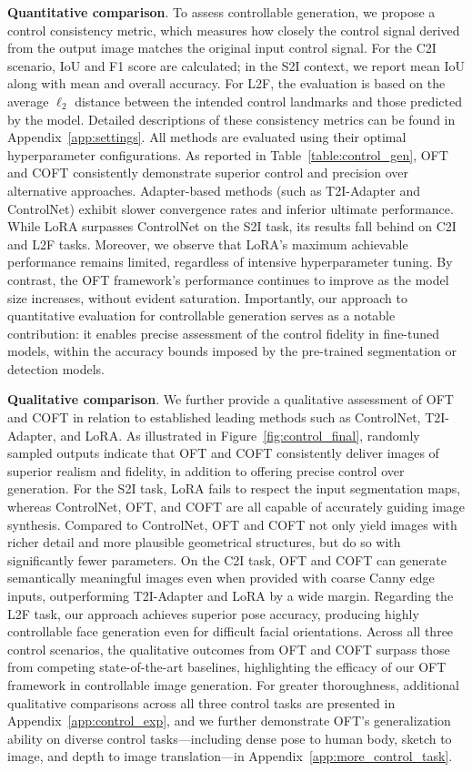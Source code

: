 \textbf{Quantitative comparison}. To assess controllable generation, we propose a control consistency metric, which measures how closely the control signal derived from the output image matches the original input control signal. For the C2I scenario, IoU and F1 score are calculated; in the S2I context, we report mean IoU along with mean and overall accuracy. For L2F, the evaluation is based on the average $\ell_2$ distance between the intended control landmarks and those predicted by the model. Detailed descriptions of these consistency metrics can be found in Appendix~\ref{app:settings}. All methods are evaluated using their optimal hyperparameter configurations. As reported in Table~\ref{table:control_gen}, OFT and COFT consistently demonstrate superior control and precision over alternative approaches. Adapter-based methods (such as T2I-Adapter and ControlNet) exhibit slower convergence rates and inferior ultimate performance. While LoRA surpasses ControlNet on the S2I task, its results fall behind on C2I and L2F tasks. Moreover, we observe that LoRA’s maximum achievable performance remains limited, regardless of intensive hyperparameter tuning. By contrast, the OFT framework’s performance continues to improve as the model size increases, without evident saturation. Importantly, our approach to quantitative evaluation for controllable generation serves as a notable contribution: it enables precise assessment of the control fidelity in fine-tuned models, within the accuracy bounds imposed by the pre-trained segmentation or detection models.

\textbf{Qualitative comparison}. We further provide a qualitative assessment of OFT and COFT in relation to established leading methods such as ControlNet, T2I-Adapter, and LoRA. As illustrated in Figure~\ref{fig:control_final}, randomly sampled outputs indicate that OFT and COFT consistently deliver images of superior realism and fidelity, in addition to offering precise control over generation. For the S2I task, LoRA fails to respect the input segmentation maps, whereas ControlNet, OFT, and COFT are all capable of accurately guiding image synthesis. Compared to ControlNet, OFT and COFT not only yield images with richer detail and more plausible geometrical structures, but do so with significantly fewer parameters. On the C2I task, OFT and COFT can generate semantically meaningful images even when provided with coarse Canny edge inputs, outperforming T2I-Adapter and LoRA by a wide margin. Regarding the L2F task, our approach achieves superior pose accuracy, producing highly controllable face generation even for difficult facial orientations. Across all three control scenarios, the qualitative outcomes from OFT and COFT surpass those from competing state-of-the-art baselines, highlighting the efficacy of our OFT framework in controllable image generation. For greater thoroughness, additional qualitative comparisons across all three control tasks are presented in Appendix~\ref{app:control_exp}, and we further demonstrate OFT’s generalization ability on diverse control tasks—including dense pose to human body, sketch to image, and depth to image translation—in Appendix~\ref{app:more_control_task}.

